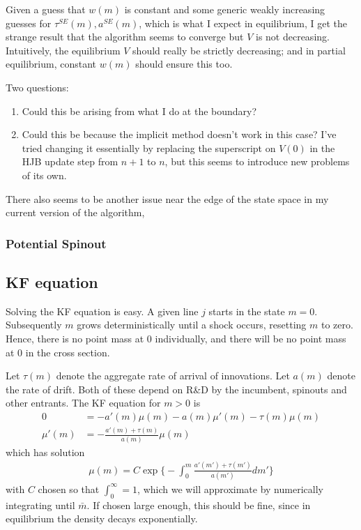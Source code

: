 \documentclass[12pt,english]{article}
\theoremstyle{remark}
\begin{document}
Given a guess that $w(m)$ is constant and some generic weakly increasing guesses for $\tau^{SE}(m), a^{SE}(m)$, which is what I expect in equilibrium, I get the strange result that the algorithm seems to converge but $V$ is not decreasing. Intuitively, the equilibrium $V$ should really be strictly decreasing; and in partial equilibrium, constant $w(m)$ should ensure this too. 

Two questions:

\begin{enumerate}
	\item Could this be arising from what I do at the boundary? 
	\item Could this be because the implicit method doesn't work in this case? I've tried changing it essentially by replacing the superscript on $V(0)$ in the HJB update step from $n+1$ to $n$, but this seems to introduce new problems of its own. 
\end{enumerate}

There also seems to be another issue near the edge of the state space in my current version of the algorithm, 


 


\subsubsection{Potential Spinout}

\subsection{KF equation}

Solving the KF equation is easy. A given line $j$ starts in the state $m = 0$. Subsequently $m$ grows deterministically until a shock occurs, resetting $m$ to zero. Hence, there is no point mass at 0 individually, and there will be no point mass at 0 in the cross section. 

Let $\tau(m)$ denote the aggregate rate of arrival of innovations. Let $a(m)$ denote the rate of drift. Both of these depend on R\&D by the incumbent, spinouts and other entrants. The KF equation for $m > 0$ is 
\begin{align*}
	0 &= -a'(m)\mu(m) - a(m)\mu'(m) - \tau(m)\mu(m) \\
	\mu'(m) &= -\frac{a'(m) + \tau(m)}{a(m)} \mu(m)
\end{align*}
which has solution 
\begin{align*}
	\mu(m) = C\exp \Bigg\{ - \int_0^m \frac{a'(m') + \tau(m')}{a(m')} dm'    \Bigg\}
\end{align*}
with $C$ chosen so that $\int_0^{\infty} = 1$, which we will approximate by numerically integrating until $\bar{m}$. If chosen large enough, this should be fine, since in equilibrium the density decays exponentially. 
\end{document}
